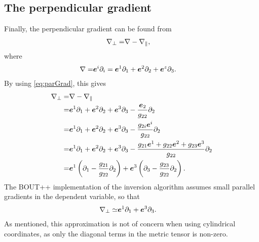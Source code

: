 \subsection{The perpendicular gradient}
%
Finally, the perpendicular gradient can be found from
\begin{align*}
    \nabla_\perp =& \nabla - \nabla_\|,
\end{align*}
%
where
%
\begin{align*}
    \nabla =& \boldsymbol{e}^i \partial_i = \boldsymbol{e}^1 \partial_1 + \boldsymbol{e}^2 \partial_2 + \boldsymbol{e}^z \partial_3.
\end{align*}
%
By using \cref{eq:parGrad}, this gives
%
\begin{align*}
    \grad_\perp =& \grad - \grad_\|\\
%
                =& \ve{e}^1 \partial_1 + \ve{e}^2 \partial_2 + \ve{e}^3
    \partial_3 - \frac{\ve{e}_2}{g_{22}} \partial_2\\
%
                =& \ve{e}^1 \partial_1 + \ve{e}^2 \partial_2 + \ve{e}^3
    \partial_3 - \frac{g_{2i}\ve{e}^i}{g_{22}} \partial_2\\
%
                =& \ve{e}^1 \partial_1 + \ve{e}^2 \partial_2 + \ve{e}^3
    \partial_3 - \frac{g_{21}\ve{e}^1 +g_{22}\ve{e}^2 +g_{23}\ve{e}^3
    }{g_{22}}\partial_2\\
%
                =& \ve{e}^1 \L(\partial_1 - \frac{g_{21}}{g_{22}}\partial_2\R)
    +  \ve{e}^3 \L(\partial_3 - \frac{g_{23}}{g_{22}}\partial_2\R).
\end{align*}
%
The BOUT++ implementation of the inversion algorithm assumes small parallel gradients in the dependent variable, so that
%
\begin{align}
    \nabla_\perp \simeq& \boldsymbol{e}^1 \partial_1 +  \boldsymbol{e}^3 \partial_3.
    \label{eq:approxPerpGrad}
\end{align}
%
As mentioned, this approximation is not of concern when using cylindrical coordinates, as only the diagonal terms in the metric tensor is non-zero.

